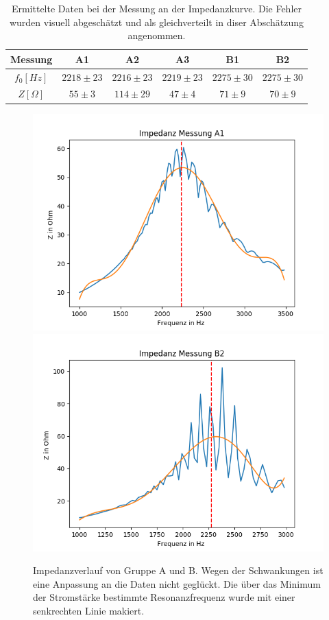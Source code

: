 \documentclass[12pt,a4paper]{article}
\begin{document}
\begin{table}
\centering
\begin{tabular}{|c|c|c|c||c|c|}
\hline
Messung & A1 & A2 & A3 & B1 & B2\\
\hline
$f_0[Hz]$ & $2218\pm 23$ & $2216\pm 23$ & $2219\pm 23$ & $2275\pm 30$ & $2275\pm 30$\\
\hline
$Z[\Omega]$ & $55\pm 3$ & $114\pm 29$ & $47\pm 4$ & $71\pm 9$ & $70\pm 9$\\
\hline
\end{tabular}
\label{tab:Parallel_Impedanz}
\caption{Ermittelte Daten bei der Messung an der Impedanzkurve. Die Fehler wurden visuell abgeschätzt und als gleichverteilt in diser Abschätzung angenommen.}
\end{table}

\begin{figure}
\centering
\includegraphics[scale=1]{Bilder/Parallel_Impedanz.png}
\includegraphics[scale=1]{Bilder/Parallel_ImpedanzB.png}
\caption{Impedanzverlauf von Gruppe A und B. Wegen der Schwankungen ist eine Anpassung an die Daten nicht geglückt. Die über das Minimum der Stromstärke bestimmte Resonanzfrequenz wurde mit einer senkrechten Linie makiert.}
\label{fig:parallel_Impedanz}
\end{figure}
\end{document}
